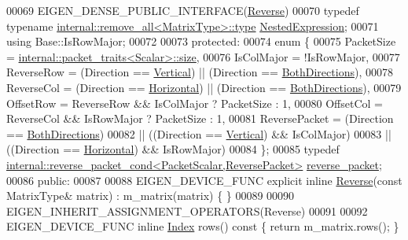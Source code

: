 \begin{DoxyCode}
00069     EIGEN\_DENSE\_PUBLIC\_INTERFACE(\hyperlink{group___core___module_class_eigen_1_1_reverse}{Reverse})
00070     \textcolor{keyword}{typedef} \textcolor{keyword}{typename} \hyperlink{group___sparse_core___module}{internal::remove\_all<MatrixType>::type} 
      \hyperlink{group___sparse_core___module}{NestedExpression};
00071     \textcolor{keyword}{using} Base::IsRowMajor;
00072 
00073   \textcolor{keyword}{protected}:
00074     \textcolor{keyword}{enum} \{
00075       PacketSize = \hyperlink{struct_eigen_1_1internal_1_1packet__traits}{internal::packet\_traits<Scalar>::size},
00076       IsColMajor = !IsRowMajor,
00077       ReverseRow = (Direction == \hyperlink{group__enums_ggad49a7b3738e273eb00932271b36127f7addca718e0564723df21d61b94b1198be}{Vertical})   || (Direction == 
      \hyperlink{group__enums_ggad49a7b3738e273eb00932271b36127f7aa01e40fce022901560ce6d9fdee2fde3}{BothDirections}),
00078       ReverseCol = (Direction == \hyperlink{group__enums_ggad49a7b3738e273eb00932271b36127f7aae8a16b3b9272683c1162915f6d892be}{Horizontal}) || (Direction == 
      \hyperlink{group__enums_ggad49a7b3738e273eb00932271b36127f7aa01e40fce022901560ce6d9fdee2fde3}{BothDirections}),
00079       OffsetRow  = ReverseRow && IsColMajor ? PacketSize : 1,
00080       OffsetCol  = ReverseCol && IsRowMajor ? PacketSize : 1,
00081       ReversePacket = (Direction == \hyperlink{group__enums_ggad49a7b3738e273eb00932271b36127f7aa01e40fce022901560ce6d9fdee2fde3}{BothDirections})
00082                     || ((Direction == \hyperlink{group__enums_ggad49a7b3738e273eb00932271b36127f7addca718e0564723df21d61b94b1198be}{Vertical})   && IsColMajor)
00083                     || ((Direction == \hyperlink{group__enums_ggad49a7b3738e273eb00932271b36127f7aae8a16b3b9272683c1162915f6d892be}{Horizontal}) && IsRowMajor)
00084     \};
00085     \textcolor{keyword}{typedef} \hyperlink{struct_eigen_1_1internal_1_1reverse__packet__cond}{internal::reverse\_packet\_cond<PacketScalar,ReversePacket>}
       \hyperlink{struct_eigen_1_1internal_1_1reverse__packet__cond}{reverse\_packet};
00086   \textcolor{keyword}{public}:
00087 
00088     EIGEN\_DEVICE\_FUNC \textcolor{keyword}{explicit} \textcolor{keyword}{inline} \hyperlink{group___core___module_class_eigen_1_1_reverse}{Reverse}(\textcolor{keyword}{const} MatrixType& matrix) : m\_matrix(matrix) \{ \}
00089 
00090     EIGEN\_INHERIT\_ASSIGNMENT\_OPERATORS(Reverse)
00091 
00092     EIGEN\_DEVICE\_FUNC \textcolor{keyword}{inline} \hyperlink{namespace_eigen_a62e77e0933482dafde8fe197d9a2cfde}{Index} rows()\textcolor{keyword}{ const }\{ \textcolor{keywordflow}{return} m\_matrix.rows(); \}

\end{DoxyCode}
